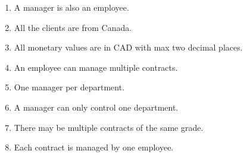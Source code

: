 \documentclass[12pt, letterpaper]{article}
\begin{document}
\begin{enumerate}
    \item A manager is also an employee.
    \item All the clients are from Canada.
    \item All monetary values are in CAD with max two decimal places.
    \item An employee can manage multiple contracts.
    \item One manager per department.
    \item A manager can only control one department.
    \item There may be multiple contracts of the same grade.
    \item Each contract is managed by one employee.
\end{enumerate}
\end{document}
